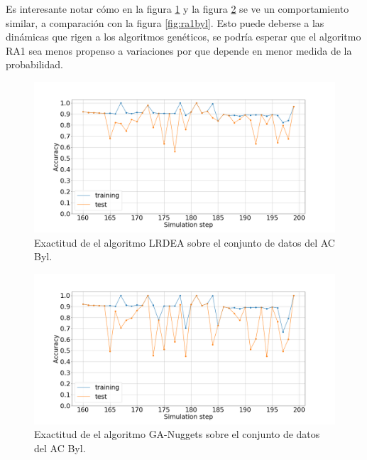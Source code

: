 Es interesante notar cómo en la figura \ref{fig:lrdeabyl} y la figura \ref{fig:ganuggetsabyl} se ve un comportamiento similar, a comparación con la figura \ref{fig:ra1byl}. Esto puede deberse a las dinámicas que rigen a los algoritmos genéticos, se podría esperar que el algoritmo RA1 sea menos propenso a variaciones por que depende en menor medida de la probabilidad.
\begin{figure}[H]
	\centering
	\includegraphics[width=\linewidth]{fig/LRDEA_4}
	\caption{Exactitud de el algoritmo LRDEA sobre el conjunto de datos del AC Byl.}
	\label{fig:lrdeabyl}
\end{figure}

\begin{figure}[H]
	\centering
	\includegraphics[width=\linewidth]{fig/GA-nuggets_5}
	\caption{Exactitud de el algoritmo GA-Nuggets sobre el conjunto de datos del AC Byl.}
	\label{fig:ganuggetsabyl}
\end{figure}

